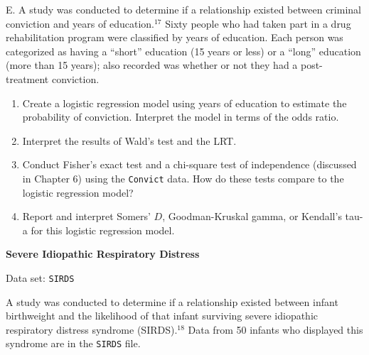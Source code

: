 \documentclass[
]{report}
\newcounter{excount}
\renewcommand{\theexcount}{E\arabic{excount}}
\begin{document}
\begin{list}{\theexcount.}{ \setlength{\itemsep}{1.2em}}
A study was conducted to determine if a relationship existed between criminal conviction and years of education.$^{17}$ Sixty people who had taken part in a drug rehabilitation program were classified by years of education. Each person was categorized as having a “short” education (15 years or less) or a “long” education (more than 15 years); also recorded was whether or not they had a post-treatment conviction.

  \begin{enumerate}
    \item Create a logistic regression model using years of education to estimate the probability of conviction. Interpret the model in terms of the odds ratio.
    \item Interpret the results of Wald’s test and the LRT.
    \item Conduct Fisher’s exact test and a chi-square test of independence (discussed in Chapter 6) using the \texttt{Convict} data. How do these tests compare to the logistic regression model?
    \item Report and interpret Somers’ $D$, Goodman-Kruskal gamma, or Kendall’s tau-a for this logistic regression model.
  \end{enumerate}

  \item \textbf{Severe Idiopathic Respiratory Distress}

Data set: \texttt{SIRDS}

A study was conducted to determine if a relationship existed between infant birthweight and the likelihood of that infant surviving severe idiopathic respiratory distress syndrome (SIRDS).$^{18}$ Data from 50 infants who displayed this syndrome are in the \texttt{SIRDS} file.


\end{list}
\end{document}
